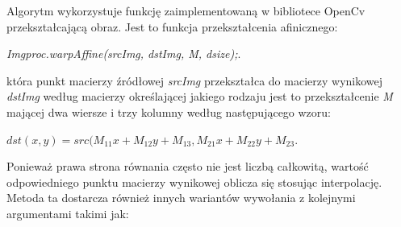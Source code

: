 \documentclass[a4paper,12pt]{article}
\begin{document}
		        Algorytm wykorzystuje funkcję zaimplementowaną w bibliotece OpenCv przekształcającą obraz. Jest to funkcja przekształcenia afinicznego:
    		    \begin{center}
    		        \textit{Imgproc.warpAffine(srcImg, dstImg, M, dsize);}.
    		    \end{center}
		        która punkt macierzy źródłowej \textit{srcImg} przekształca do macierzy wynikowej \textit{dstImg} według macierzy określającej jakiego rodzaju jest to przekształcenie \textit{M} mającej dwa wiersze i trzy kolumny według następującego wzoru:
                \begin{center}
                    \textit{$dst(x,y) = src( M_{11} x + M_{12} y + M_{13}, M_{21} x + M_{22} y + M_{23}$}.
                \end{center} 
                Ponieważ prawa strona równania często nie jest liczbą całkowitą, wartość odpowiedniego punktu macierzy wynikowej oblicza się stosując interpolację. Metoda ta dostarcza również innych wariantów wywołania z kolejnymi argumentami takimi jak: 
                \newpage
\end{document}
